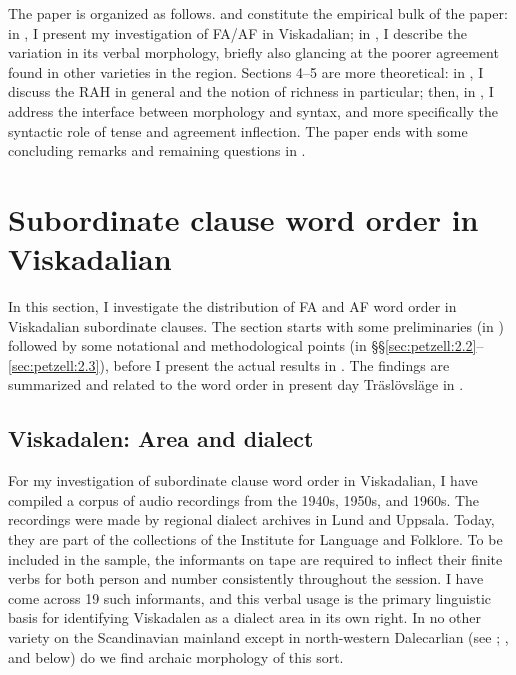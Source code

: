 \documentclass[output=paper,colorlinks,citecolor=brown,draft,draftmode]{langscibook}
\begin{document}
The paper is organized as follows.  and  constitute the empirical bulk of the paper: in , I present my investigation of FA/AF in Viskadalian; in , I describe the variation in its verbal morphology, briefly also glancing at the poorer agreement found in other varieties in the region. Sections 4–5 are more theoretical: in , I discuss the RAH in general and the notion of richness in particular; then, in , I address the interface between morphology and syntax, and more specifically the syntactic role of tense and agreement inflection. The paper ends with some concluding remarks and remaining questions in .


\section{Subordinate clause word order in Viskadalian}\label{sec:petzell:2}


In this section, I investigate the distribution of FA and AF word order in Viskadalian subordinate clauses. The section starts with some preliminaries (in ) followed by some notational and methodological points (in §§\ref{sec:petzell:2.2}--\ref{sec:petzell:2.3}), before I present the actual results in . The findings are summarized and related to the word order in present day Träslövsläge in .


\subsection{Viskadalen: Area and dialect}\label{sec:petzell:2.1}


For my investigation of subordinate clause word order in Viskadalian, I have compiled a corpus of audio recordings from the 1940s, 1950s, and 1960s. The recordings were made by regional dialect archives in Lund and Uppsala. Today, they are part of the collections of the Institute for Language and Folklore. To be included in the sample, the informants on tape are required to inflect their finite verbs for both person and number consistently throughout the session. I have come across 19 such informants, and this verbal usage is the primary linguistic basis for identifying Viskadalen as a dialect area in its own right. In no other variety on the Scandinavian mainland except in north-western Dalecarlian (see \citealt{Levander1928}; \citealt{Garbacz2010}, and  below) do we find archaic morphology of this sort.
\end{document}
